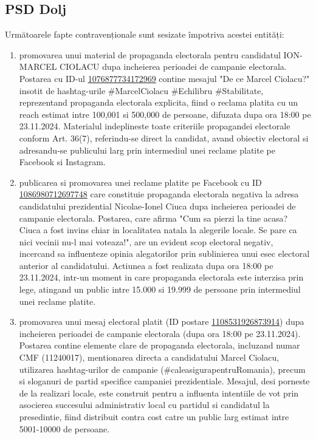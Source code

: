 \documentclass[a4paper,12pt]{article}
\begin{document}
\vspace{0.5cm}

\subsection{PSD Dolj}
Următoarele fapte contravenționale sunt sesizate împotriva acestei entități:

\begin{enumerate}[leftmargin=*, label=\arabic*.)]
    \item promovarea unui material de propaganda electorala pentru candidatul ION-MARCEL CIOLACU dupa incheierea perioadei de campanie electorala. Postarea cu ID-ul \href{https://www.facebook.com/ads/library/?id=1076877734172969}{1076877734172969} contine mesajul "De ce Marcel Ciolacu?" insotit de hashtag-urile \#MarcelCiolacu \#Echilibru \#Stabilitate, reprezentand propaganda electorala explicita, fiind o reclama platita cu un reach estimat intre 100,001 si 500,000 de persoane, difuzata dupa ora 18:00 pe 23.11.2024. Materialul indeplineste toate criteriile propagandei electorale conform Art. 36(7), referindu-se direct la candidat, avand obiectiv electoral si adresandu-se publicului larg prin intermediul unei reclame platite pe Facebook si Instagram.
    \item publicarea si promovarea unei reclame platite pe Facebook cu ID \href{https://www.facebook.com/ads/library/?id=1086980712697748}{1086980712697748} care constituie propaganda electorala negativa la adresa candidatului prezidential Nicolae-Ionel Ciuca dupa incheierea perioadei de campanie electorala. Postarea, care afirma "Cum sa pierzi la tine acasa? Ciuca a fost invins chiar in localitatea natala la alegerile locale. Se pare ca nici vecinii nu-l mai voteaza!", are un evident scop electoral negativ, incercand sa influenteze opinia alegatorilor prin sublinierea unui esec electoral anterior al candidatului. Actiunea a fost realizata dupa ora 18:00 pe 23.11.2024, intr-un moment in care propaganda electorala este interzisa prin lege, atingand un public intre 15.000 si 19.999 de persoane prin intermediul unei reclame platite.
    \item promovarea unui mesaj electoral platit (ID postare \href{https://www.facebook.com/ads/library/?id=1108531926873914}{1108531926873914}) dupa incheierea perioadei de campanie electorala (dupa ora 18:00 pe 23.11.2024). Postarea contine elemente clare de propaganda electorala, incluzand numar CMF (11240017), mentionarea directa a candidatului Marcel Ciolacu, utilizarea hashtag-urilor de campanie (\#caleasigurapentruRomania), precum si sloganuri de partid specifice campaniei prezidentiale. Mesajul, desi porneste de la realizari locale, este construit pentru a influenta intentiile de vot prin asocierea succesului administrativ local cu partidul si candidatul la presedintie, fiind distribuit contra cost catre un public larg estimat intre 5001-10000 de persoane.

\end{enumerate}
\end{document}
